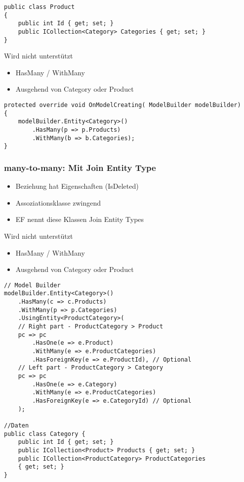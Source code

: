 \begin{multicols*}{2}
\begin{lstlisting}
public class Product
{
    public int Id { get; set; }
    public ICollection<Category> Categories { get; set; } 
}
\end{lstlisting}
 Wird nicht unterstützt
\begin{itemize}
    \item HasMany / WithMany
    \item Ausgehend von Category oder Product
\end{itemize}
\begin{lstlisting}
protected override void OnModelCreating( ModelBuilder modelBuilder)
{
    modelBuilder.Entity<Category>()
        .HasMany(p => p.Products)
        .WithMany(b => b.Categories);
}
\end{lstlisting}

\subsubsection{many-to-many: Mit Join Entity Type}
\begin{itemize}
    \item Beziehung hat Eigenschaften (IsDeleted)
    \item Assoziationsklasse zwingend
    \item EF nennt diese Klassen Join Entity Types
\end{itemize}

 Wird nicht unterstützt
\begin{itemize}
    \item HasMany / WithMany
    \item Ausgehend von Category oder Product
\end{itemize}
\begin{lstlisting}
// Model Builder
modelBuilder.Entity<Category>() 
    .HasMany(c => c.Products) 
    .WithMany(p => p.Categories) 
    .UsingEntity<ProductCategory>(
    // Right part - ProductCategory > Product
    pc => pc
        .HasOne(e => e.Product)
        .WithMany(e => e.ProductCategories) 
        .HasForeignKey(e => e.ProductId), // Optional
    // Left part - ProductCategory > Category
    pc => pc
        .HasOne(e => e.Category)
        .WithMany(e => e.ProductCategories) 
        .HasForeignKey(e => e.CategoryId) // Optional       
    );

//Daten
public class Category {
    public int Id { get; set; }
    public ICollection<Product> Products { get; set; } 
    public ICollection<ProductCategory> ProductCategories
    { get; set; }
}
    

\end{lstlisting}
\end{multicols*}
